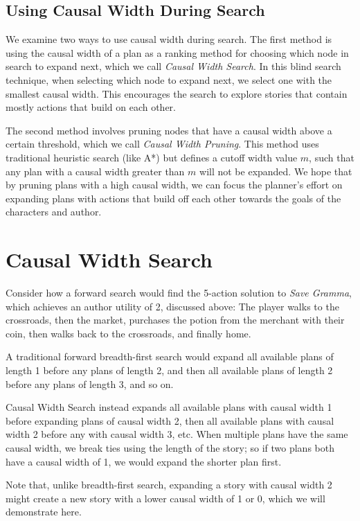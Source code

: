 \documentclass[letterpaper]{article} %
\begin{document}
\subsection{Using Causal Width During Search}
We examine two ways to use causal width during search. The first method is using the causal width of a plan as a ranking method for choosing which node in search to expand next, which we call \textit{Causal Width Search}. In this blind search technique, when selecting which node to expand next, we select one with the smallest causal width. This encourages the search to explore stories that contain mostly actions that build on each other.

The second method involves pruning nodes that have a causal width above a certain threshold, which we call \textit{Causal Width Pruning}. This method uses traditional heuristic search (like A*) but defines a cutoff width value $m$, such that any plan with a causal width greater than $m$ will not be expanded. We hope that by pruning plans with a high causal width, we can focus the planner's effort on expanding plans with actions that build off each other towards the goals of the characters and author.

\section{Causal Width Search}

Consider how a forward search would find the 5-action solution to \textit{Save Gramma}, which achieves an author utility of 2, discussed above: The player walks to the crossroads, then the market, purchases the potion from the merchant with their coin, then walks back to the crossroads, and finally home.

A traditional forward breadth-first search would expand all available plans of length 1 before any plans of length 2, and then all available plans of length 2 before any plans of length 3, and so on.

Causal Width Search instead expands all available plans with causal width 1 before expanding plans of causal width 2, then all available plans with causal width 2 before any with causal width 3, etc. When multiple plans have the same causal width, we break ties using the length of the story; so if two plans both have a causal width of 1, we would expand the shorter plan first.

Note that, unlike breadth-first search, expanding a story with causal width 2 might create a new story with a lower causal width of 1 or 0, which we will demonstrate here.
\end{document}
